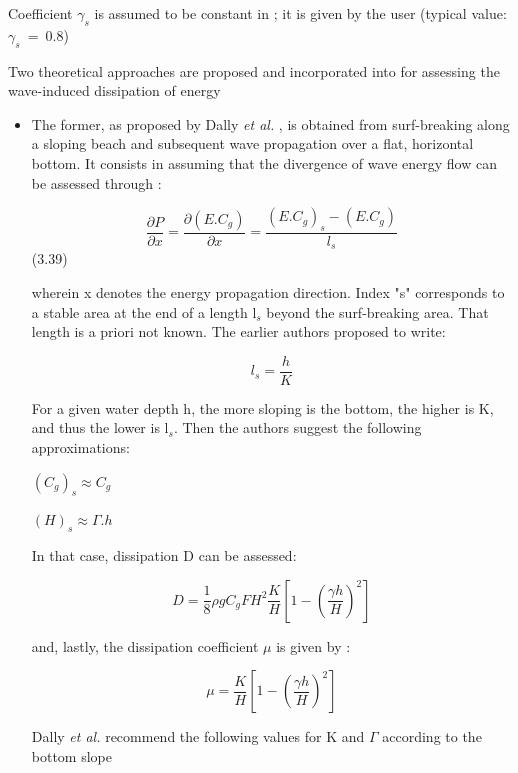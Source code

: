 Coefficient $\gamma_{s}$ is assumed to be constant in \artemis{}; it is given
by the user (typical value: $\gamma_{s}$~=~0.8)

Two theoretical approaches are proposed and incorporated into \artemis{} for assessing the wave-induced dissipation of energy

\begin{itemize}
\item  The former, as proposed by Dally \textit{et al.} \cite{Dally1984}, is obtained from surf-breaking along a sloping beach and subsequent wave propagation over a flat, horizontal bottom. It consists in assuming that the divergence of wave energy flow can be assessed through :

\begin{equation}
  \frac{\partial P}{\partial x} = \frac{\partial(E.C_{g})}{\partial x} = \frac{(E.C_{g})_{s}-(E.C_{g})}{l_{s}}
  \label{eq:3.39}
\end{equation}
   (3.39)

wherein x denotes the energy propagation direction. Index "s" corresponds to a
    stable area at the end of a length l${}_{s}$ beyond the surf-breaking area.
    That length is a priori not known. The earlier authors proposed to write:

    \[ l_{s} = \frac{h}{K}\]

For a given water depth h, the more sloping is the bottom, the higher is K, and
    thus the lower is l${}_{s}$. Then the authors suggest the following
    approximations:

    $(C_{g})_{s} \approx C_{g} $

    $(H)_{s} \approx \Gamma.h$

In that case, dissipation D can be assessed:

    \begin{equation}
      D = \frac{1}{8}\rho gC_{g}FH^{2}\frac{K}{H}\left[1-\left(\frac{\gamma h}{H}\right)^{2}\right]
      \label{eq:3.40}
    \end{equation}

and, lastly, the dissipation coefficient $\mu$ is given by :

    \begin{equation}
      \mu = \frac{K}{H}\left[1-\left(\frac{\gamma h}{H}\right)^{2}\right]
      \label{eq:3.41}
    \end{equation}

Dally \textit{et al.} \cite{Dally1984} recommend the following values for K
    and $\Gamma$ according to the bottom slope


\end{itemize}
